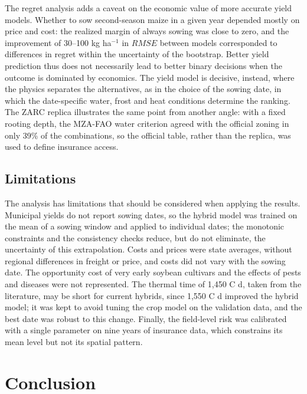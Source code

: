 \documentclass[10pt,a4paper]{article}
\begin{document}
The regret analysis adds a caveat on the economic value of more accurate yield models. Whether to sow
second-season maize in a given year depended mostly on price and cost: the realized margin of always sowing
was close to zero, and the improvement of 30--100 kg ha$^{-1}$ in $RMSE$ between models corresponded to
differences in regret within the uncertainty of the bootstrap. Better yield prediction thus does not
necessarily lead to better binary decisions when the outcome is dominated by economics. The yield model is
decisive, instead, where the physics separates the alternatives, as in the choice of the sowing date, in
which the date-specific water, frost and heat conditions determine the ranking. The ZARC replica illustrates
the same point from another angle: with a fixed rooting depth, the MZA-FAO water criterion agreed with the
official zoning in only 39\% of the combinations, so the official table, rather than the replica, was used
to define insurance access.

\subsection{Limitations}
\label{subsec:dis_limitations}

The analysis has limitations that should be considered when applying the results. Municipal yields do not
report sowing dates, so the hybrid model was trained on the mean of a sowing window and applied to individual
dates; the monotonic constraints and the consistency checks reduce, but do not eliminate, the uncertainty of
this extrapolation. Costs and prices were state averages, without regional differences in freight or price,
and costs did not vary with the sowing date. The opportunity cost of very early soybean cultivars and the
effects of pests and diseases were not represented. The thermal time of 1,450 \textdegree{}C d, taken from the
literature, may be short for current hybrids, since 1,550 \textdegree{}C d improved the hybrid model; it was
kept to avoid tuning the crop model on the validation data, and the best date was robust to this change.
Finally, the field-level risk was calibrated with a single parameter on nine years of insurance data, which
constrains its mean level but not its spatial pattern.

\section{Conclusion}
\label{sec:conclusion}
\end{document}
